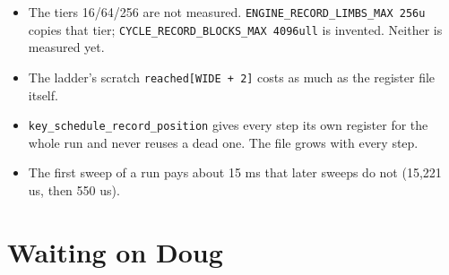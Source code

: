 \begin{itemize}
\item The tiers 16/64/256 are not measured. \texttt{ENGINE\_\allowbreak{}RECORD\_\allowbreak{}LIMBS\_\allowbreak{}MAX 256u} copies that tier; \texttt{CYCLE\_\allowbreak{}RECORD\_\allowbreak{}BLOCKS\_\allowbreak{}MAX 4096ull} is invented. Neither is measured yet.
\item The ladder's scratch \texttt{reached[WIDE + 2]} costs as much as the register file itself.
\item \texttt{key\_\allowbreak{}schedule\_\allowbreak{}record\_\allowbreak{}position} gives every step its own register for the whole run and never reuses a dead one. The file grows with every step.
\item The first sweep of a run pays about 15 ms that later sweeps do not (15,221 us, then 550 us).
\end{itemize}

\section{\texorpdfstring{Waiting on Doug}{Waiting on Doug}}

